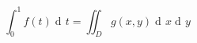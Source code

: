 \documentclass[nofonts]{ctexbook}
\DeclareMathOperator\dif{d\!}
\begin{document}
\[
	\int_0^1 f(t) \dif t = \iint_D g(x, y) \dif x \dif y
\]
\end{document}
